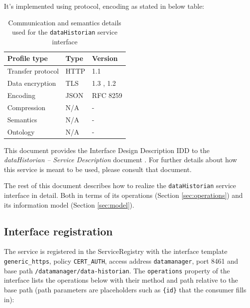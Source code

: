\documentclass[a4paper]{arrowhead}
\begin{document}
It's implemented using protocol, encoding as stated in below table:
\begin{table}[ht!]
  \centering
  \begin{tabular}{|l|l|l|}
    \hline
    \rowcolor{gray!33} Profile type & Type & Version \\ \hline
    Transfer protocol & HTTP & 1.1 \cite{rfc9112} \\ \hline
    Data encryption & TLS & 1.3 \cite{rfc8446}, 1.2 \cite{rfc5246} \\ \hline
    Encoding & JSON & RFC 8259 \cite{rfc8259} \\ \hline
    Compression & N/A & - \\ \hline
    Semantics & N/A & - \\ \hline
    Ontology & N/A & - \\ \hline
  \end{tabular}
  \caption{Communication and semantics details used for the \texttt{dataHistorian} service interface}
  \label{tab:comunication_semantics_profile}
\end{table}

This document provides the Interface Design Description IDD to the \textit{dataHistorian -- Service Description} document \cite{dm-dataHistorian-sd}.
For further details about how this service is meant to be used, please consult that document.

The rest of this document describes how to realize the \texttt{dataHistorian} service
interface in detail. Both in terms of its operations (Section \ref{sec:operations}) and its information model (Section \ref{sec:model}).

\subsection{Interface registration}

The service is registered in the ServiceRegistry with the interface template \texttt{generic\_\allowbreak{}https}, policy \texttt{CERT\_\allowbreak{}AUTH}, access address \texttt{datamanager}, port 8461 and base path \texttt{/\allowbreak{}datamanager/\allowbreak{}data-\allowbreak{}historian}. The \texttt{operations} property of the interface lists the operations below with their method and path relative to the base path (path parameters are placeholders such as \texttt{\{id\}} that the consumer fills in):
\end{document}
